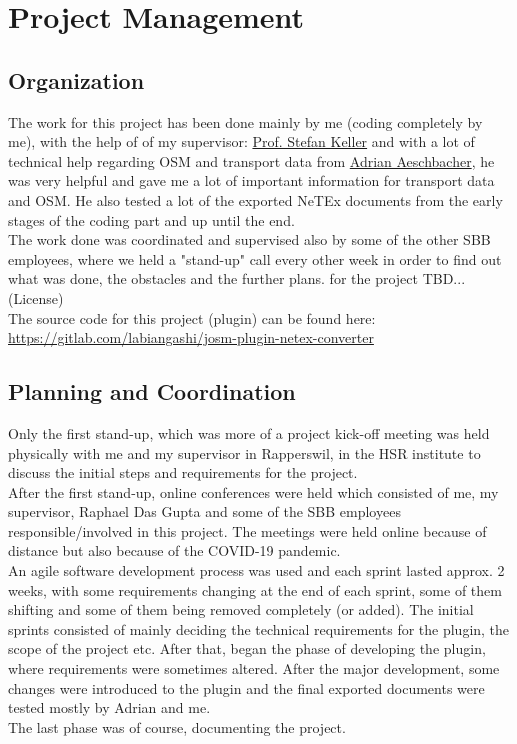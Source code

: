 \chapter{Project Management}
\section{Organization}
The work for this project has been done mainly by me (coding completely by me), with the help of of my supervisor: \href{mailto:stefan.keller@hsr.ch}{Prof. Stefan Keller} and with a lot of technical help regarding OSM and transport data from \href{mailto:adrian.aeschbacher2@sbb.ch}{Adrian Aeschbacher}, he was very helpful and gave me a lot of important information for transport data and OSM. He also tested a lot of the exported NeTEx documents from the early stages of the coding part and up until the end.\\
\newline
The work done was coordinated and supervised also by some of the other SBB employees, where we held a "stand-up" call every other week in order to find out what was done, the obstacles and the further plans. for the project
TBD...(License)\\
\newline
The source code for this project (plugin) can be found here:\\ \href{https://gitlab.com/labiangashi/josm-plugin-netex-converter}{https://gitlab.com/labiangashi/josm-plugin-netex-converter}
\newpage
\section{Planning and Coordination}
Only the first stand-up, which was more of a project kick-off meeting was held physically with me and my supervisor in Rapperswil, in the HSR institute to discuss the initial steps and requirements for the project.\\
After the first stand-up, online conferences were held which consisted of me, my supervisor, Raphael Das Gupta and some of the SBB employees responsible/involved in this project. The meetings were held online because of distance but also because of the COVID-19 pandemic.\\
An agile software development process was used and each sprint lasted approx. 2 weeks, with some requirements changing at the end of each sprint, some of them shifting and some of them being removed completely (or added). The initial sprints consisted of mainly deciding the technical requirements for the plugin, the scope of the project etc. After that, began the phase of developing the plugin, where requirements were sometimes altered. After the major development, some changes were introduced to the plugin and the final exported documents were tested mostly by Adrian and me.\\
The last phase was of course, documenting the project.
